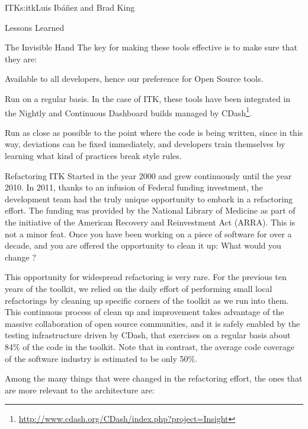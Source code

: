 \begin{aosachapter}{ITK}{s:itk}{Luis Ib\'{a}\~{n}ez and Brad King}
\begin{aosasect1}{Lessons Learned}
\begin{aosasect2}{The Invisible Hand}
The key for making these tools effective is to make sure that they are:
\begin{aosaitemize}
\item Available to all developers, hence our preference for Open Source tools.
\item Run on a regular basis. In the case of ITK, these tools have been
integrated in the Nightly and Continuous Dashboard builds managed by
CDash\footnote{\url{http://www.cdash.org/CDash/index.php?project=Insight}}.
\item Run as close as possible to the point where the code is being written,
since in this way, deviations can be fixed immediately, and developers train
themselves by learning what kind of practices break style rules.
\end{aosaitemize}

\end{aosasect2}

\begin{aosasect2}{Refactoring}
ITK Started in the year 2000 and grew continuously until the year 2010. In
2011, thanks to an infusion of Federal funding investment, the development team
had the truly unique opportunity to embark in a refactoring effort. The funding
was provided by the National Library of Medicine as part of the initiative of
the American Recovery and Reinvestment Act (ARRA). This is not a minor feat.
Once you have been working on a piece of software for over a decade, and you
are offered the opportunity to clean it up: What would you change ?

This opportunity for widespread refactoring is very rare. For the previous ten
years of the toolkit, we relied on the daily effort of performing small local
refactorings by cleaning up specific corners of the toolkit as we run into
them.  This continuous process of clean up and improvement takes advantage of
the massive collaboration of open source communities, and it is safely enabled
by the testing infrastructure driven by CDash, that exercises on a regular
basis about 84\% of the code in the toolkit. Note that in contrast, the average
code coverage of the software industry is estimated to be only 50\%.

Among the many things that were changed in the refactoring effort, the ones
that are more relevant to the architecture are:


\end{aosasect2}
\end{aosasect1}
\end{aosachapter}
